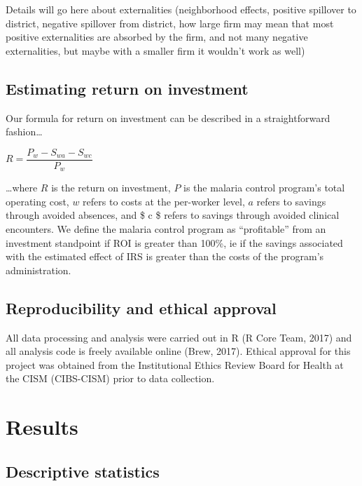 \documentclass[]{article}
\begin{document}
Details will go here about externalities (neighborhood effects, positive
spillover to district, negative spillover from district, how large firm
may mean that most positive externalities are absorbed by the firm, and
not many negative externalities, but maybe with a smaller firm it
wouldn't work as well)

\subsection{Estimating return on
investment}\label{estimating-return-on-investment}

Our formula for return on investment can be described in a
straightforward fashion\ldots{}

\begin{center}
$R = \dfrac{P_{w} - S_{wa} - S_{wc}}{P_{w}}$

\end{center}

\ldots{}where \(R\) is the return on investment, \(P\) is the malaria
control program's total operating cost, \(w\) refers to costs at the
per-worker level, \(a\) refers to savings through avoided absences, and
\$ c \$ refers to savings through avoided clinical encounters. We define
the malaria control program as ``profitable'' from an investment
standpoint if ROI is greater than 100\%, ie if the savings associated
with the estimated effect of IRS is greater than the costs of the
program's administration.

\subsection{Reproducibility and ethical
approval}\label{reproducibility-and-ethical-approval}

All data processing and analysis were carried out in R (R Core Team,
2017) and all analysis code is freely available online (Brew, 2017).
Ethical approval for this project was obtained from the Institutional
Ethics Review Board for Health at the CISM (CIBS-CISM) prior to data
collection.

\newpage

\section{Results}\label{results}

\subsection{Descriptive statistics}\label{descriptive-statistics}
\end{document}
